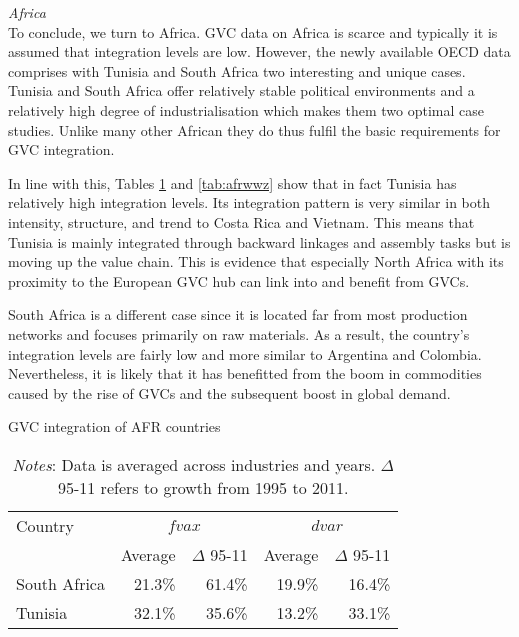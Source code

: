 \documentclass[a4paper,11pt]{article}
\begin{document}
\textit{Africa}\\
To conclude, we turn to Africa. GVC data on Africa is scarce and typically it is assumed that integration levels are low. However, the newly available OECD data comprises with Tunisia and South Africa two interesting and unique cases. Tunisia and South Africa offer relatively stable political environments and a relatively high degree of industrialisation which makes them two optimal case studies. Unlike many other African they do thus fulfil the basic requirements for GVC integration.

In line with this, Tables \ref{tab:afrgvc} and \ref{tab:afrwwz} show that in fact Tunisia has relatively high integration levels. Its integration pattern is very similar in both intensity, structure, and trend to Costa Rica and Vietnam. This means that Tunisia is mainly integrated through backward linkages and assembly tasks but is moving up the value chain. This is evidence that especially North Africa with its proximity to the European GVC hub can link into and benefit from GVCs.

South Africa is a different case since it is located far from most production networks and focuses primarily on raw materials. As a result, the country's integration levels are fairly low and more similar to Argentina and Colombia. Nevertheless, it is likely that it has benefitted from the boom in commodities caused by the rise of GVCs and the subsequent boost in global demand.\\

\begin{table}[htbp]\small
  \centering
  \caption{GVC integration of AFR countries}
    \begin{tabular}{lrrrr}
    \toprule
    Country & \multicolumn{2}{c}{{$fvax$}} & \multicolumn{2}{c}{{$dvar$}} \\
    \multicolumn{1}{c}{} & \multicolumn{1}{c}{Average} & \multicolumn{1}{c}{$\Delta$ 95-11} & \multicolumn{1}{c}{Average} & \multicolumn{1}{c}{$\Delta$ 95-11} \\
    \midrule
    South Africa & 21.3\% & 61.4\% & 19.9\% & 16.4\% \\
    Tunisia & 32.1\% & 35.6\% & 13.2\% & 33.1\% \\
\bottomrule
\end{tabular}
  \label{tab:afrgvc}
     \caption*{\textit{Notes}: Data is averaged across industries and years. $\Delta$ 95-11 refers to growth from 1995 to 2011.}
\end{table}
\vspace{-1.2cm}
\end{document}
